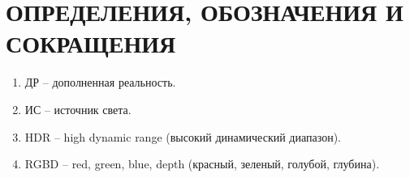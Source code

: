 \chapter*{ОПРЕДЕЛЕНИЯ, ОБОЗНАЧЕНИЯ И СОКРАЩЕНИЯ}

\begin{enumerate}
	\item ДР -- дополненная реальность. 
	\item ИС -- источник света.
	\item HDR -- high dynamic range (высокий динамический диапазон).
	\item RGBD -- red, green, blue, depth (красный, зеленый, голубой, глубина).
\end{enumerate}